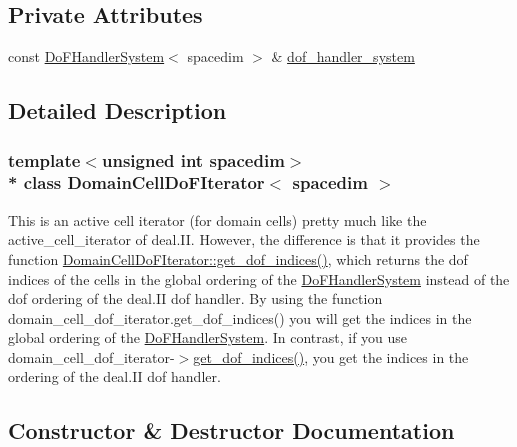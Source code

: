 \subsection*{Private Attributes}
\begin{DoxyCompactItemize}
\item 
const \hyperlink{class_do_f_handler_system}{Do\+F\+Handler\+System}$<$ spacedim $>$ \& \hyperlink{class_domain_cell_do_f_iterator_a7431a0505f1e5b0b796c7f58cf9a060c}{dof\+\_\+handler\+\_\+system}
\end{DoxyCompactItemize}


\subsection{Detailed Description}
\subsubsection*{template$<$unsigned int spacedim$>$\\*
class Domain\+Cell\+Do\+F\+Iterator$<$ spacedim $>$}

This is an active cell iterator (for domain cells) pretty much like the active\+\_\+cell\+\_\+iterator of deal.\+II. However, the difference is that it provides the function \hyperlink{class_domain_cell_do_f_iterator_ad93f1a26a4efd4ca94af45d13e250aba}{Domain\+Cell\+Do\+F\+Iterator\+::get\+\_\+dof\+\_\+indices()}, which returns the dof indices of the cells in the global ordering of the \hyperlink{class_do_f_handler_system}{Do\+F\+Handler\+System} instead of the dof ordering of the deal.\+II dof handler. By using the function domain\+\_\+cell\+\_\+dof\+\_\+iterator.\+get\+\_\+dof\+\_\+indices() you will get the indices in the global ordering of the \hyperlink{class_do_f_handler_system}{Do\+F\+Handler\+System}. In contrast, if you use domain\+\_\+cell\+\_\+dof\+\_\+iterator-\/$>$\hyperlink{class_domain_cell_do_f_iterator_ad93f1a26a4efd4ca94af45d13e250aba}{get\+\_\+dof\+\_\+indices()}, you get the indices in the ordering of the deal.\+II dof handler. 

\subsection{Constructor \& Destructor Documentation}
